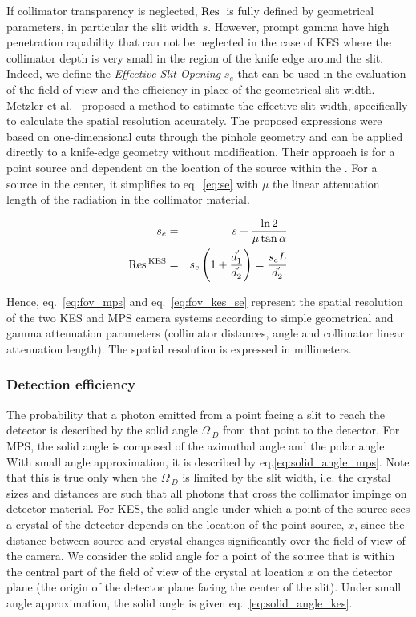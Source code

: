 \documentclass[a4paper,english]{article}
\begin{document}
If collimator transparency is neglected, $\textrm{Res}\,_{}$ is fully defined by
geometrical parameters, in particular the slit width $s$. However, prompt gamma
have high penetration capability that can not be neglected in the
case of KES where the collimator depth is very small in the region of the knife edge around the slit. Indeed, we define the \textit{Effective Slit Opening} $s_e$ that can be used in the evaluation of the field of view and the efficiency in place of the geometrical slit width. Metzler et al.~\cite{Metzler2005}
proposed a method to estimate the effective slit width, specifically to calculate
the spatial resolution accurately. The proposed expressions were based on
one-dimensional cuts through the pinhole geometry and can be applied directly to
a knife-edge geometry without modification. Their approach is for a point source
and dependent on the location of the source within the \FOV. For a source in the
center, it simplifies to eq.~\ref{eq:se} with $\mu$ the linear attenuation
length of the radiation in the collimator material.

\begin{eqnarray}
  s_e & = & s + \frac{\ln2}{\mu\tan\alpha}   \label{eq:se} \\
   \textrm{Res}\,_{}^{\textrm{KES}} & = & s_e\left(1+ \frac{d_1^{'}}{d_2^{'}}\right) = \frac{s_eL}{d_2^{'}}          
  \label{eq:fov_kes_se}
\end{eqnarray}

Hence, eq.~\ref{eq:fov_mps} and eq.~\ref{eq:fov_kes_se} represent the spatial
resolution of the two KES and MPS camera systems according to simple geometrical and gamma attenuation parameters (collimator distances, angle and collimator linear attenuation length). The spatial resolution is expressed in millimeters. 

\subsubsection{Detection efficiency}

The probability that a photon emitted from a point facing a slit to reach the
detector is described by the solid angle $\Omega\,_D$ from that point to the
detector. For MPS, the solid angle is composed of the azimuthal angle
and the polar angle. With small angle approximation, it is described by
eq.\ref{eq:solid_angle_mps}. Note that this is true only when the $\Omega\,_D$ is
limited by the slit width, i.e. the crystal sizes and distances are such that
all photons that cross the collimator impinge on detector material. For KES, the
solid angle under which a point of the source sees a crystal of the detector
depends on the location of the point source, $x$, since the distance between source
and crystal changes significantly over the field of view of the camera. We
consider the solid angle for a point of the source that is within the central
part of the field of view of the crystal at location $x$ on the detector plane
(the origin of the detector plane facing the center of the slit). Under small
angle approximation, the solid angle is given eq.~\ref{eq:solid_angle_kes}.
\end{document}
